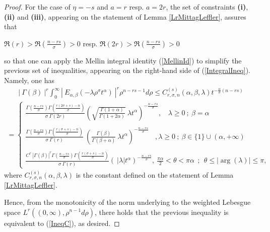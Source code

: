\documentclass{amsart}
\theoremstyle{definition}
\theoremstyle{remark}
\numberwithin{equation}{section}
\begin{document}
{\begin{proof}
				For the case of $\eta=-s$ and $a=r$ resp. $a=2r$, the set of constraints {\bf (i)}, {\bf (ii)} and {\bf (iii)}, appearing on the statement of 
				Lemma \ref{LrMittagLeffler}, assures that
				\begin{center}
					$\displaystyle \Re(r)>\Re\left(\frac{n-rs}{\sigma}\right)>0$ resp. $\displaystyle \Re(2r)>\Re\left(\frac{n-rs}{\sigma}\right)>0$  
				\end{center}
				so that one can apply the Mellin integral identity (\ref{MellinId}) to simplify the previous set of inequalities, appearing on the right-hand side of (\ref{IntegralIneq}). Namely, one has 
				\begin{eqnarray*}	\left|~\Gamma(\beta)~\right|^r\int_0^\infty\left|~ E_{\alpha,\beta}(-\lambda \rho^\sigma t^{\alpha})~\right|^r\rho^{n-rs-1}d\rho \leq C_{r,\sigma,n}^{(s)}(\alpha,\beta,\lambda) t^{-\frac{\alpha}{\sigma}\left({n-rs}\right)}
				\end{eqnarray*}
				\begin{eqnarray*}
					=\begin{cases} \displaystyle \frac{\Gamma\left(\frac{ n-rs}{\sigma}\right)\Gamma\left(\frac{r(2\sigma+s)-n}{\sigma}\right)}{\sigma~\Gamma(2r)}\left(\sqrt{\frac{\Gamma(1+\alpha)}{\Gamma(1+2\alpha)}}~\lambda  t^{\alpha}\right)^{-\frac{n-rs}{\sigma}} \displaystyle,~~~~\lambda\geq 0~;~\beta=\alpha
						\\ \ \\
						\displaystyle \frac{\Gamma\left(\frac{ n-rs}{\sigma}\right)\Gamma\left(\frac{r(\sigma+s)-n}{\sigma}\right)}{\sigma~\Gamma(r)}~\left(\frac{\Gamma(\beta)}{\Gamma(\beta+\alpha)}~\lambda t^{\alpha}\right)^{-\frac{n-rs}{\sigma}} ~~~~,\lambda\geq 0~;~\beta\in \{1\}\cup (\alpha,+\infty) \\ \ \\
						\displaystyle \frac{C^r~|\Gamma(\beta)|^r\Gamma\left(\frac{ n-rs}{\sigma}\right)\Gamma\left(\frac{r(\sigma+s)-n}{\sigma}\right)}{\sigma~\Gamma(r)}\left(~|\lambda| t^{\alpha}\right)^{-\frac{n-rs}{\sigma}},~\frac{\pi\alpha}{2}<\theta<\pi \alpha~~;~~\theta\leq |\arg(\lambda)|\leq \pi,
					\end{cases}
				\end{eqnarray*}
				where $C_{r,\sigma,n}^{(s)}(\alpha,\beta,\lambda)$ is the constant defined on the statement of Lemma \ref{LrMittagLeffler}.
				
				Hence, from the monotonicity of the norm underlying to the weighted Lebesgue space $L^r((0,\infty),\rho^{n-1}d\rho)$, there holds that the previous inequality is equivalent to (\ref{IneqC}), as desired.
			\end{proof}
			
}
\end{document}
